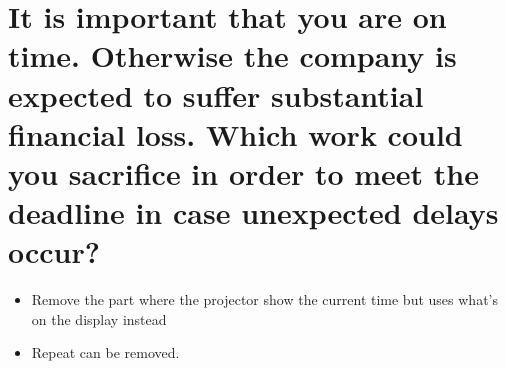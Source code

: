 \documentclass[Main]{subfiles}
\begin{document}
\section{It is important that you are on time. 
	Otherwise the company is expected to suffer substantial financial loss. 
	Which work could you sacrifice in order to meet the deadline in case unexpected delays occur?}

\begin{itemize}
	\item Remove the part where the projector show the current time but uses what's on the display instead
	\item Repeat can be removed.
\end{itemize}
\end{document}
